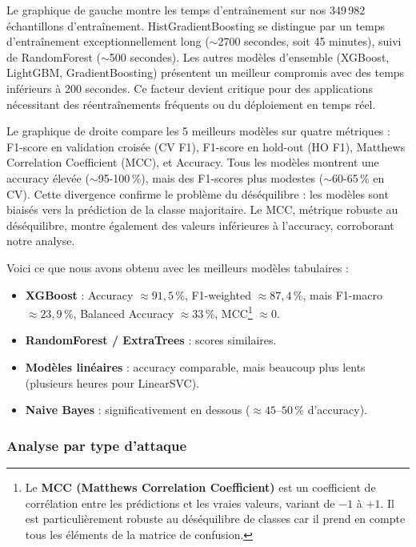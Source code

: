 ﻿\documentclass[11pt,a4paper]{article}
\begin{document}
Le graphique de gauche montre les temps d'entraînement sur nos 349\,982 échantillons d'entraînement. HistGradientBoosting se distingue par un temps d'entraînement exceptionnellement long ($\sim$2700 secondes, soit 45 minutes), suivi de RandomForest ($\sim$500 secondes). Les autres modèles d'ensemble (XGBoost, LightGBM, GradientBoosting) présentent un meilleur compromis avec des temps inférieurs à 200 secondes. Ce facteur devient critique pour des applications nécessitant des réentraînements fréquents ou du déploiement en temps réel.

Le graphique de droite compare les 5 meilleurs modèles sur quatre métriques : F1-score en validation croisée (CV F1), F1-score en hold-out (HO F1), Matthews Correlation Coefficient (MCC), et Accuracy. Tous les modèles montrent une accuracy élevée ($\sim$95-100\,\%), mais des F1-scores plus modestes ($\sim$60-65\,\% en CV). Cette divergence confirme le problème du déséquilibre : les modèles sont biaisés vers la prédiction de la classe majoritaire. Le MCC, métrique robuste au déséquilibre, montre également des valeurs inférieures à l'accuracy, corroborant notre analyse.

Voici ce que nous avons obtenu avec les meilleurs modèles tabulaires :
\begin{itemize}
    \item \textbf{XGBoost} : Accuracy $\approx 91{,}5\,\%$, F1-weighted $\approx 87{,}4\,\%$, mais F1-macro $\approx 23{,}9\,\%$, Balanced Accuracy $\approx 33\,\%$, MCC\footnote{Le \textbf{MCC (Matthews Correlation Coefficient)} est un coefficient de corrélation entre les prédictions et les vraies valeurs, variant de $-1$ à $+1$. Il est particulièrement robuste au déséquilibre de classes car il prend en compte tous les éléments de la matrice de confusion.} $\approx 0$.
    \item \textbf{RandomForest / ExtraTrees} : scores similaires.
    \item \textbf{Modèles linéaires} : accuracy comparable, mais beaucoup plus lents (plusieurs heures pour LinearSVC).
    \item \textbf{Naive Bayes} : significativement en dessous ($\approx 45$--$50\,\%$ d'accuracy).
\end{itemize}

\subsubsection{Analyse par type d'attaque}
\end{document}
